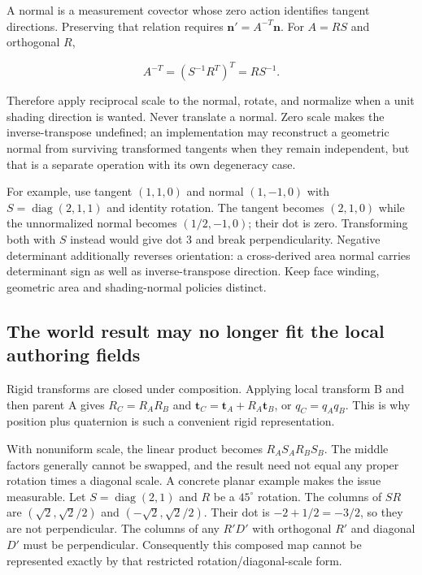 \hypertarget{01-foundations-i-ch019-normals-undo-scale-before-following-rotation}{}

A normal is a measurement covector whose zero action identifies tangent directions. Preserving that relation requires \(\mathbf n'=A^{-T}\mathbf n\). For \(A=RS\) and orthogonal \(R\),

\[
A^{-T}=\left(S^{-1}R^T\right)^T=RS^{-1}.
\]

Therefore apply reciprocal scale to the normal, rotate, and normalize when a unit shading direction is wanted. Never translate a normal. Zero scale makes the inverse-transpose undefined; an implementation may reconstruct a geometric normal from surviving transformed tangents when they remain independent, but that is a separate operation with its own degeneracy case.

For example, use tangent \((1,1,0)\) and normal \((1,-1,0)\) with \(S=\operatorname{diag}(2,1,1)\) and identity rotation. The tangent becomes \((2,1,0)\) while the unnormalized normal becomes \((1/2,-1,0)\); their dot is zero. Transforming both with \(S\) instead would give dot \(3\) and break perpendicularity. Negative determinant additionally reverses orientation: a cross-derived area normal carries determinant sign as well as inverse-transpose direction. Keep face winding, geometric area and shading-normal policies distinct.

\subsection{The world result may no longer fit the local authoring fields}\label{01-foundations-i-ch019-the-world-result-may-no-longer-fit-the-local-authoring-fields}

\hypertarget{01-foundations-i-ch019-the-world-result-may-no-longer-fit-the-local-authoring-fields}{}

Rigid transforms are closed under composition. Applying local transform B and then parent A gives \(R_C=R_AR_B\) and \(\mathbf t_C=\mathbf t_A+R_A\mathbf t_B\), or \(q_C=q_Aq_B\). This is why position plus quaternion is such a convenient rigid representation.

With nonuniform scale, the linear product becomes \(R_AS_AR_BS_B\). The middle factors generally cannot be swapped, and the result need not equal any proper rotation times a diagonal scale. A concrete planar example makes the issue measurable. Let \(S=\operatorname{diag}(2,1)\) and \(R\) be a \(45^\circ\) rotation. The columns of \(SR\) are \((\sqrt2,\sqrt2/2)\) and \((-\sqrt2,\sqrt2/2)\). Their dot is \(-2+1/2=-3/2\), so they are not perpendicular. The columns of any \(R'D'\) with orthogonal \(R'\) and diagonal \(D'\) must be perpendicular. Consequently this composed map cannot be represented exactly by that restricted rotation/diagonal-scale form.

